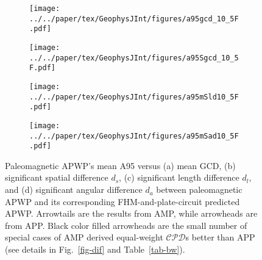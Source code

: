 \begin{figure}[!ht]
  \captionsetup[subfigure]{singlelinecheck=off,justification=raggedright,aboveskip=-6pt,belowskip=-6pt}
  \centering
  \begin{subfigure}[htbp]{.49\textwidth}
    \caption{}\texttt{[image: ../../paper/tex/GeophysJInt/figures/a95gcd\_10\_5F.pdf]}\label{fig-A95GCD105F}
  \end{subfigure}
  \begin{subfigure}[htbp]{.49\textwidth}
    \caption{}\texttt{[image: ../../paper/tex/GeophysJInt/figures/a95Sgcd\_10\_5F.pdf]}\label{fig-A95SGCD105F}
  \end{subfigure}
  \begin{subfigure}[htbp]{.49\textwidth}
    \caption{}\texttt{[image: ../../paper/tex/GeophysJInt/figures/a95mSld10\_5F.pdf]}\label{fig-A95mSld105F}
  \end{subfigure}
  \begin{subfigure}[htbp]{.49\textwidth}
    \caption{}\texttt{[image: ../../paper/tex/GeophysJInt/figures/a95mSad10\_5F.pdf]}\label{fig-A95mSad105F}
  \end{subfigure}
  \caption[APP spatially better than AMP (arrow)]{Paleomagnetic APWP's mean A95
    versus (a) mean GCD, (b) significant spatial difference $d_s$, (c)
    significant length difference $d_l$, and (d) significant angular difference
    $d_a$ between paleomagnetic APWP and its corresponding FHM-and-plate-circuit
    predicted APWP\@. Arrowtails are the results from AMP, while arrowheads are
    from APP\@. Black color filled arrowheads are the small number of special
    cases of AMP derived equal-weight $\mathcal{CPD}$s better than APP (see
    details in Fig.~\ref{fig-dif} and Table~\ref{tab-bw}).}\label{fig-A95mG105F}
\end{figure}

